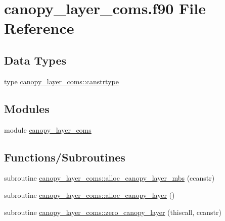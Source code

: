\hypertarget{canopy__layer__coms_8f90}{}\section{canopy\+\_\+layer\+\_\+coms.\+f90 File Reference}
\label{canopy__layer__coms_8f90}
\subsection*{Data Types}
\begin{DoxyCompactItemize}
\item 
type \hyperlink{structcanopy__layer__coms_1_1canstrtype}{canopy\+\_\+layer\+\_\+coms\+::canstrtype}
\end{DoxyCompactItemize}
\subsection*{Modules}
\begin{DoxyCompactItemize}
\item 
module \hyperlink{namespacecanopy__layer__coms}{canopy\+\_\+layer\+\_\+coms}
\end{DoxyCompactItemize}
\subsection*{Functions/\+Subroutines}
\begin{DoxyCompactItemize}
\item 
subroutine \hyperlink{namespacecanopy__layer__coms_ae9d291b6afeedf9357cb7a2b6fa55c89}{canopy\+\_\+layer\+\_\+coms\+::alloc\+\_\+canopy\+\_\+layer\+\_\+mbs} (ccanstr)
\item 
subroutine \hyperlink{namespacecanopy__layer__coms_ab4c3f9e7c1af06ec442d70c76e66130b}{canopy\+\_\+layer\+\_\+coms\+::alloc\+\_\+canopy\+\_\+layer} ()
\item 
subroutine \hyperlink{namespacecanopy__layer__coms_a35bc9ed614af3affcdbfe5b81f97bb12}{canopy\+\_\+layer\+\_\+coms\+::zero\+\_\+canopy\+\_\+layer} (thiscall, ccanstr)
\end{DoxyCompactItemize}
